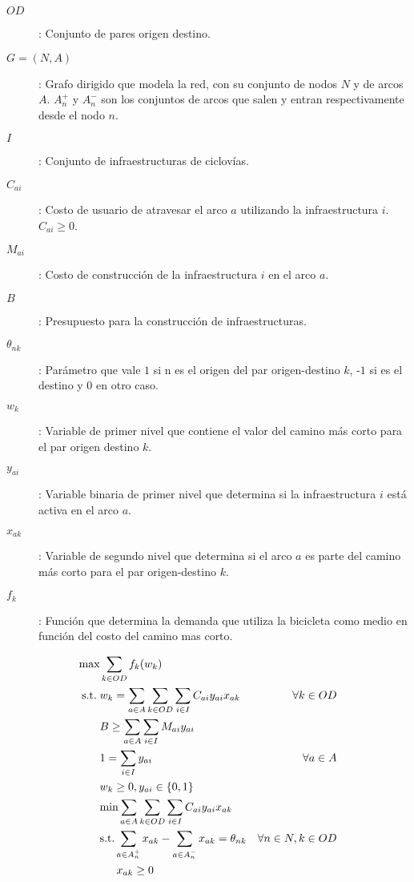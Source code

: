 \documentclass{article}
\newcommand{\modelspace}{\hspace{1.5em}}
\begin{document}
  \begin{description}
    \item[$OD$]: Conjunto de pares origen destino.
    \item[$G=(N,A)$]: Grafo dirigido que modela la red, con su conjunto de nodos $N$ y de arcos $A$. $A_n^+$ y $A_n^-$ son los conjuntos de arcos que salen y entran respectivamente desde el nodo $n$.
    \item[$I$]: Conjunto de infraestructuras de ciclovías.
    \item[$C_{ai}$]: Costo de usuario de atravesar el arco $a$ utilizando la infraestructura $i$. $C_{ai} \geq 0$.
    \item[$M_{ai}$]: Costo de construcción de la infraestructura $i$ en el arco $a$.
    \item[$B$]: Presupuesto para la construcción de infraestructuras.
    \item[$\theta_{nk}$]: Parámetro que vale $1$ si n es el origen del par origen-destino $k$, -$1$ si es el destino y $0$ en otro caso.
    \item[$w_k$]: Variable de primer nivel que contiene el valor del camino más corto para el par origen destino $k$.
    \item[$y_{ai}$]: Variable binaria de primer nivel que determina si la infraestructura $i$ está activa en el arco $a$.
    \item[$x_{ak}$]: Variable de segundo nivel que determina si el arco $a$ es parte del camino más corto para el par origen-destino $k$.
    \item[$f_k$]: Función que determina la demanda que utiliza la bicicleta como medio en función del costo del camino mas corto.
  \end{description}

  \begin{align}
    \text{max}    & \sum_{k \in OD} f_k(w_k)                                                         & \label{eq:objective1lvl} \\
    \text{s.t.}\; & w_k = \sum_{a \in A} \sum_{k \in OD} \sum_{i \in I} C_{ai}y_{ai}x_{ak}           & \forall k \in OD \label{eq:shortestpath} \\
                  & B \geq \sum_{a \in A} \sum_{i \in I} M_{ai}y_{ai}                                & \label{eq:respectbudget} \\
                  & 1 = \sum_{i \in I} y_{ai}                                                        & \forall a \in A \label{eq:alwaysoney} \\
                  & w_k \geq 0, y_{ai} \in \left\{ 0, 1 \right\}                                     & \nonumber \\
                  & \text{min} \sum_{a \in A} \sum_{k \in OD} \sum_{i \in I} C_{ai}y_{ai}x_{ak}      & \label{eq:subproblem} \\
                  & \text{s.t.} \sum_{a \in A_n^+} x_{ak} - \sum_{a \in A_n^-} x_{ak} = \theta_{nk}  & \forall n \in N, k \in OD \label {eq:flowbalance} \\
                  & \modelspace x_{ak} \geq 0                                                        & \nonumber
  \end{align}
\end{document}
